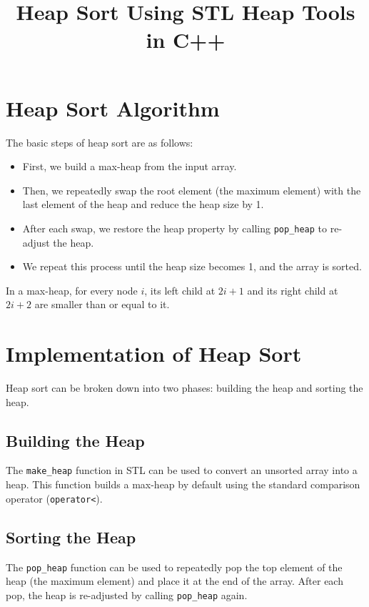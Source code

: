 \documentclass[12pt]{article}
\title{Heap Sort Using STL Heap Tools in C++}
\begin{document}
\maketitle


\section{Heap Sort Algorithm}
The basic steps of heap sort are as follows:

\begin{itemize}
    \item First, we build a max-heap from the input array.
    \item Then, we repeatedly swap the root element (the maximum element) with the last element of the heap and reduce the heap size by 1.
    \item After each swap, we restore the heap property by calling \texttt{pop\_heap} to re-adjust the heap.
    \item We repeat this process until the heap size becomes 1, and the array is sorted.
\end{itemize}

In a max-heap, for every node $i$, its left child at $2i + 1$ and its right child at $2i + 2$ are smaller than or equal to it.

\section{Implementation of Heap Sort}
Heap sort can be broken down into two phases: building the heap and sorting the heap.

\subsection{Building the Heap}
The \texttt{make\_heap} function in STL can be used to convert an unsorted array into a heap. This function builds a max-heap by default using the standard comparison operator (\texttt{operator<}).

\subsection{Sorting the Heap}
The \texttt{pop\_heap} function can be used to repeatedly pop the top element of the heap (the maximum element) and place it at the end of the array. After each pop, the heap is re-adjusted by calling \texttt{pop\_heap} again.
\end{document}
